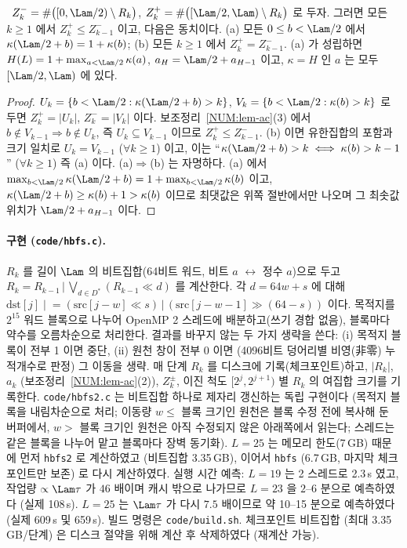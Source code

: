\begin{lemma}[이동 항등식의 계수 판정]\label{NUM:lem-shift}
\PROVED\ $Z^-_k=\#\bigl([0,\Lam/2)\setminus R_k\bigr)$, $Z^+_k=\#\bigl([\Lam/2,\Lam)\setminus R_k\bigr)$ 로 두자.
그러면 모든 $k\ge1$ 에서 $Z^+_k\le Z^-_{k-1}$ 이고, 다음은 동치이다.
(a) 모든 $0\le b<\Lam/2$ 에서 $\kappa(\Lam/2+b)=1+\kappa(b)$;
(b) 모든 $k\ge1$ 에서 $Z^+_k=Z^-_{k-1}$.
(a) 가 성립하면 $H(L)=1+\max_{a<\Lam/2}\kappa(a)$, $a_{H}=\Lam/2+a_{H-1}$ 이고, $\kappa=H$ 인 $a$ 는 모두 $[\Lam/2,\Lam)$ 에 있다.
\end{lemma}
\begin{proof}
$U_k=\{b<\Lam/2:\kappa(\Lam/2+b)>k\}$, $V_{k}=\{b<\Lam/2:\kappa(b)>k\}$ 로 두면 $Z^+_k=|U_k|$, $Z^-_k=|V_k|$ 이다.
보조정리~\ref{NUM:lem-ac}(3) 에서 $b\notin V_{k-1}\Rightarrow b\notin U_k$, 즉 $U_k\subseteq V_{k-1}$ 이므로
$Z^+_k\le Z^-_{k-1}$. (b) 이면 유한집합의 포함과 크기 일치로 $U_k=V_{k-1}$ ($\forall k\ge1$) 이고, 이는
``$\kappa(\Lam/2+b)>k\iff\kappa(b)>k-1$'' ($\forall k\ge 1$) 즉 (a) 이다. (a)$\Rightarrow$(b) 는 자명하다.
(a) 에서 $\max_{b<\Lam/2}\kappa(\Lam/2+b)=1+\max_{b<\Lam/2}\kappa(b)$ 이고, $\kappa(\Lam/2+b)\ge\kappa(b)+1>\kappa(b)$ 이므로
최댓값은 위쪽 절반에서만 나오며 그 최솟값 위치가 $\Lam/2+a_{H-1}$ 이다.
\end{proof}

\paragraph{구현 (\texttt{code/hbfs.c}).}
$R_k$ 를 길이 $\Lam$ 의 비트집합(64비트 워드, 비트 $a$ $\leftrightarrow$ 정수 $a$)으로 두고
$R_k=R_{k-1}\,\big|\,\bigvee_{d\in D^*}(R_{k-1}\ll d)$ 를 계산한다. 각 $d=64w+s$ 에 대해
$\mathrm{dst}[j]\mathrel{|}=(\mathrm{src}[j-w]\ll s)\,|\,(\mathrm{src}[j-w-1]\gg(64-s))$ 이다.
목적지를 $2^{15}$ 워드 블록으로 나누어 OpenMP 2 스레드에 배분하고(쓰기 경합 없음), 블록마다 약수를 오름차순으로 처리한다.
결과를 바꾸지 않는 두 가지 생략을 쓴다: (i) 목적지 블록이 전부 1 이면 중단,
(ii) 원천 창이 전부 0 이면 (4096비트 덩어리별 비영(非零) 누적개수로 판정) 그 이동을 생략.
매 단계 $R_k$ 를 디스크에 기록(체크포인트)하고, $|R_k|$, $a_k$ (보조정리~\ref{NUM:lem-ac}(2)), $Z^\pm_k$,
이진 척도 $[2^j,2^{j+1})$ 별 $R_k$ 의 여집합 크기를 기록한다.
\texttt{code/hbfs2.c} 는 비트집합 하나로 제자리 갱신하는 독립 구현이다
(목적지 블록을 내림차순으로 처리; 이동량 $w\le$ 블록 크기인 원천은 블록 수정 전에 복사해 둔 버퍼에서,
$w>$ 블록 크기인 원천은 아직 수정되지 않은 아래쪽에서 읽는다; 스레드는 같은 블록을 나누어 맡고 블록마다 장벽 동기화).
$L=25$ 는 메모리 한도(7\,GB) 때문에 먼저 \texttt{hbfs2} 로 계산하였고 (비트집합 3.35\,GB), 이어서 \texttt{hbfs} (6.7\,GB, 마지막 체크포인트만 보존) 로 다시 계산하였다.
실행 시간 예측: $L=19$ 는 2 스레드로 2.3\,s 였고, 작업량 $\propto\Lam\tau$ 가 $46$ 배이며 캐시 밖으로 나가므로 $L=23$ 을 $2$--$6$ 분으로 예측하였다 (실제 108\,s).
$L=25$ 는 $\Lam\tau$ 가 다시 $7.5$ 배이므로 약 10--15 분으로 예측하였다 (실제 609\,s 및 659\,s).
빌드 명령은 \texttt{code/build.sh}. 체크포인트 비트집합 (최대 3.35\,GB/단계) 은 디스크 절약을 위해 계산 후 삭제하였다 (재계산 가능).

